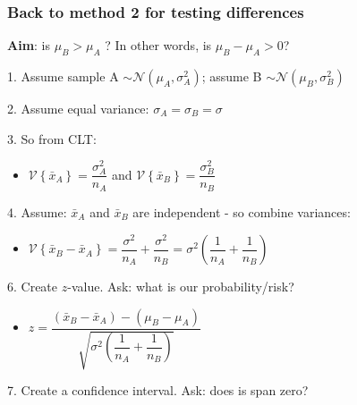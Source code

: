 \begin{frame}\frametitle{Back to method 2 for testing differences}

	\textbf{Aim}: is $\mu_B > \mu_A$ ? In other words, is $\mu_B - \mu_A > 0$?

	1. Assume sample A $\sim \mathcal{N}\left(\mu_A, \sigma^2_A\right)$; assume B $\sim \mathcal{N}\left(\mu_B, \sigma^2_B\right)$

	2. Assume equal variance: $\sigma_A = \sigma_B = \sigma$

	3. So from CLT:
	\begin{itemize}
		\item	$\mathcal{V}\left\{\bar{x}_A\right\} = \dfrac{\sigma^2_A}{n_A}$ and $\mathcal{V}\left\{\bar{x}_B\right\} = \dfrac{\sigma^2_B}{n_B}$
	\end{itemize}

	4. Assume: $\bar{x}_A$ and $\bar{x}_B$ are independent - so combine variances:
	\begin{itemize}
		\item	$\mathcal{V}\left\{\bar{x}_B - \bar{x}_A\right\} = \dfrac{\sigma^2}{n_A} + \dfrac{\sigma^2}{n_B} = \sigma^2 \left(\dfrac{1}{n_A} + \dfrac{1}{n_B}\right)$
	\end{itemize}

	6. Create $z$-value. Ask: what is our probability/risk?
	\begin{itemize}
		\item$z = \dfrac{(\bar{x}_B - \bar{x}_A) - (\mu_B - \mu_A)}{\sqrt{\sigma^2 \left(\dfrac{1}{n_A} + \dfrac{1}{n_B}\right)}}$
	\end{itemize}

	7. Create a confidence interval. Ask: does is span zero?
	

	{\small
	
		 \hspace{-0.5cm} 
	
	}
\end{frame}

